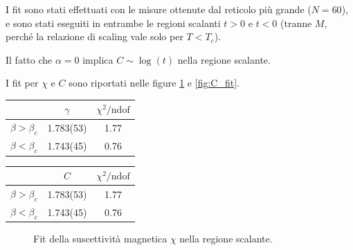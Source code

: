 \documentclass[a4paper,11pt]{article}
\begin{document}
	I fit sono stati effettuati con le misure ottenute dal reticolo più grande ($N = 60$), e sono stati eseguiti in entrambe le regioni scalanti $t > 0$ e $t < 0$ (tranne $M$, perché la relazione di scaling vale solo per $T < T_c$).
	
	Il fatto che $\alpha = 0$ implica $C \sim \log(t)$ nella regione scalante.
	
	I fit per $\chi$ e $C$ sono riportati nelle figure \ref{fig:chi_fit} e \ref{fig:C_fit}. 
	
	\begin{table}
        \begin{tabular}{c c c} \hline 
                & $\gamma$  & $\chi^2 / \text{ndof}$ \\ \hline
                $\beta > \beta_c$ & 1.783(53) & 1.77 \\
                $\beta < \beta_c$ & 1.743(45) & 0.76  \\ \hline
        \end{tabular}
	\end{table}
	
	\begin{table}
        \begin{tabular}{c c c} \hline 
                & $C$  & $\chi^2 / \text{ndof}$ \\ \hline
                $\beta > \beta_c$ & 1.783(53) & 1.77 \\
                $\beta < \beta_c$ & 1.743(45) & 0.76  \\ \hline
        \end{tabular}
	\end{table}

	
	\begin{figure}
        \centering
        \caption{Fit della suscettività magnetica $\chi$ nella regione scalante.}
        \label{fig:chi_fit}
	\end{figure}
\end{document}
